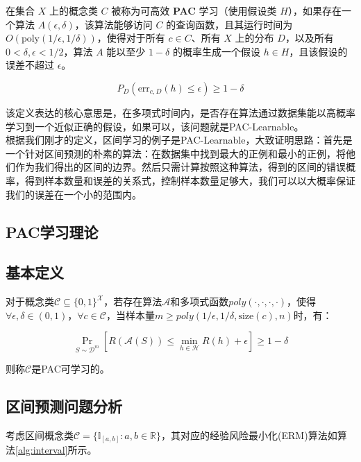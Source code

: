 \documentclass{article}
\begin{document}
\begin{definition}
    在集合 \( X \) 上的概念类 \( C \) 被称为可高效 \textbf{PAC} 学习（使用假设类 \( H \)），如果存在一个算法 \( A(\epsilon, \delta) \)，该算法能够访问 \( C \) 的查询函数，且其运行时间为 \( O(\text{poly}(1/\epsilon, 1/\delta)) \)，使得对于所有 \( c \in C \)、所有 \( X \) 上的分布 \( D \)，以及所有 \( 0 < \delta, \epsilon < 1/2 \)，算法 \( A \) 能以至少 \( 1 - \delta \) 的概率生成一个假设 \( h \in H \)，且该假设的误差不超过 \(\epsilon\)。

    \[
    P_D(\text{err}_{c,D}(h) \leq \epsilon) \geq 1 - \delta
    \]
\end{definition}
 该定义表达的核心意思是，在多项式时间内，是否存在算法通过数据集能以高概率学习到一个近似正确的假设，如果可以，该问题就是PAC-Learnable。\\
 根据我们刚才的定义，区间学习的例子是PAC-Learnable，大致证明思路：首先是一个针对区间预测的朴素的算法：在数据集中找到最大的正例和最小的正例，将他们作为我们得出的区间的边界。然后只需计算按照这种算法，得到的区间的错误概率，得到样本数量和误差的关系式，控制样本数量足够大，我们可以以大概率保证我们的误差在一个小的范围内。

\subsection{PAC学习理论}


\subsection{基本定义}
\begin{definition}[PAC学习]
对于概念类$\mathcal{C} \subseteq \{0,1\}^\mathcal{X}$，若存在算法$\mathcal{A}$和多项式函数$poly(\cdot,\cdot,\cdot,\cdot)$，使得$\forall \epsilon,\delta \in (0,1)$，$\forall c \in \mathcal{C}$，当样本量$m \geq poly(1/\epsilon,1/\delta,\text{size}(c),n)$时，有：

\begin{equation}
\Pr_{S\sim\mathcal{D}^m}\left[R(\mathcal{A}(S)) \leq \min_{h\in\mathcal{H}}R(h) + \epsilon\right] \geq 1-\delta
\end{equation}

则称$\mathcal{C}$是PAC可学习的。
\end{definition}

\subsection{区间预测问题分析}
考虑区间概念类$\mathcal{C} = \{\mathbb{I}_{[a,b]}: a,b \in \mathbb{R}\}$，其对应的经验风险最小化(ERM)算法如算法\ref{alg:interval}所示。
\end{document}
